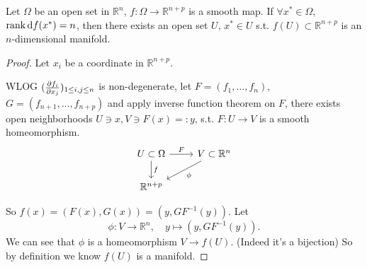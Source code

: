 \begin{theorem}
    Let $\Omega$ be an open set in $ \mathbb{R}^{n}$,
	$f: \Omega\to \mathbb{R}^{n+p}$ is a smooth map.
	If $\forall x^*\in \Omega$, $\operatorname{rank} \mathop{}\!\mathrm{d} f(x^*) = n$,
	then there exists an open set $U$, $x^*\in U$ s.t.
	$f(U) \subset \mathbb{R}^{n+p}$ is an $n$-dimensional manifold.
\end{theorem}
\begin{proof}[Proof]
    Let $x_i$ be a coordinate in $\mathbb{R}^{n+p}$.

	WLOG $(\frac{\partial f_i}{\partial x_j})_{1\le i,j\le n}$ is non-degenerate,
	let $F = (f_1,\dots, f_n)$, $G = (f_{n+1},\dots, f_{n+p})$
	and apply inverse function theorem on $F$,
	there exists open neighborhoods $U\ni x, V\ni F(x)=:y$,
	s.t. $F: U\to V$ is a smooth homeomorphism.
	\begin{equation*}
		\begin{tikzcd}
			U \subset \Omega\dar["f"]\rar["F"] &V \subset \mathbb{R}^{n}\dlar["\phi"]
			\\\mathbb{R}^{n+p}
		\end{tikzcd}
	\end{equation*}

	So $f(x) = (F(x), G(x)) = (y, GF^{-1}(y))$.
	Let
	\[
		\phi: V\to \mathbb{R}^{n},\quad
		y\mapsto (y, GF^{-1}(y)).
	\]
	We can see that $\phi$ is a homeomorphism $V \to f(U)$.
	(Indeed it's a bijection)
	So by definition we know $f(U)$ is a manifold.
\end{proof}
